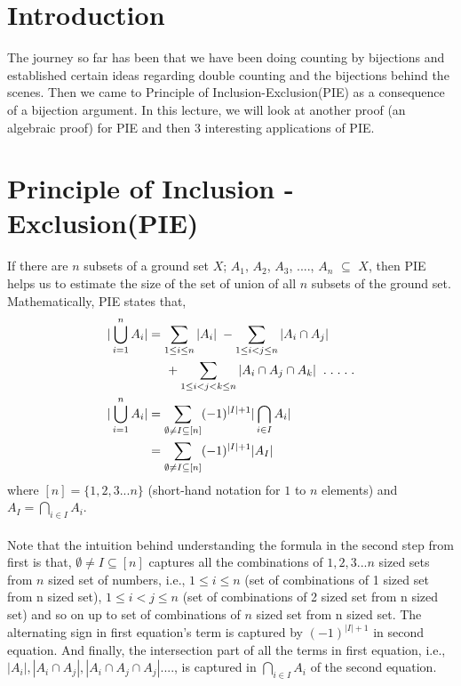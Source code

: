 
\section{Introduction}
The journey so far has been that we have been doing counting by bijections and established certain ideas regarding double counting and the bijections behind the scenes. Then we came to Principle of Inclusion-Exclusion(PIE) as a consequence of a bijection argument. In this lecture, we will look at another proof (an algebraic proof) for PIE and then 3 interesting applications of PIE.

\section{Principle of Inclusion - Exclusion(PIE)} \label{sec:Principle of Inclusion - Exclusion(PIE)}
If there are $n$ subsets of a ground set $X$; $A_1$, $A_2$, $A_3$, ...., $A_n$ $\subseteq$ $X$, then PIE helps us to estimate the size of the set of union of all $n$ subsets of the ground set. Mathematically, PIE states that,
\begin{align*}
|\bigcup_{i=1}^{n} A_i| &= \sum_{1 \le i \le n} | A_i|
\hspace{0.1cm}- \sum_{1 \le i < j \le n} | A_i \cap A_j| \\
&\hspace{0.5cm}+ \sum_{1 \le i < j < k \le n} | A_i \cap A_j \cap A_k| \hspace{0.2cm}.\hspace{0.1cm}.\hspace{0.1cm}.\hspace{0.1cm}.\hspace{0.1cm}.\\
|\bigcup_{i=1}^{n} A_i| &= \sum_{\emptyset \neq I \subseteq [n]} (-1)^{|I| +1} |\bigcap_{i \in I} A_i|\\
&=\sum_{\emptyset \neq I \subseteq [n]} (-1)^{|I| +1} |A_I|
\end{align*}
where $[n] = \{1,2,3...n\} $ (short-hand notation for $1$ to $n$ elements) and $A_I = \bigcap_{i \in I} A_i$.\\
\\
Note that the intuition behind understanding the formula in the second step from first is that, $ \emptyset \neq I \subseteq [n]$ captures all the combinations of $1,2,3...n$ sized sets from $n$ sized set of numbers, i.e., $1 \le i \le n$ (set of combinations of 1 sized set from n sized set), $1 \le i < j \le n$ (set of combinations of 2 sized set from n sized set) and so on up to set of combinations of $n$ sized set from n sized set. The alternating sign in first equation's term is captured by $(-1)^{|I| +1}$ in second equation. And finally, the intersection part of all the terms in first equation, i.e., $|A_i|, |A_i \cap A_j|,  |A_i \cap A_j \cap A_j|$...., is captured in $ \bigcap_{i \in I} A_i$ of the second equation.
